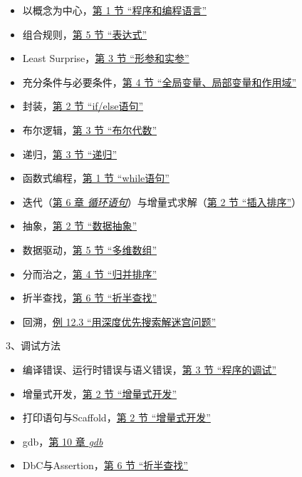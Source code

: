 \begin{itemize}

\item 以概念为中心，\hyperlink{db.intro.program}{第 1 节 “程序和编程语言”}

\item 组合规则，\hyperlink{db.expr.expression}{第 5 节 “表达式”}

\item Least Surprise，\hyperlink{db.ch03s03.id2713785}{第 3 节 “形参和实参”}

\item 充分条件与必要条件，\hyperlink{db.ch03s04.id2714471}{第 4 节 “全局变量、局部变量和作用域”}

\item 封装，\hyperlink{db.ch04s02.id2718511}{第 2 节 “if/\BookSplit{}else语句”}

\item 布尔逻辑，\hyperlink{db.ch04s03.id2718970}{第 3 节 “布尔代数”}

\item 递归，\hyperlink{db.ch05s03.id2722951}{第 3 节 “递归”}

\item 函数式编程，\hyperlink{db.ch06s01.id2726104}{第 1 节 “while语句”}

\item 迭代（\hyperlink{db.ch06.id2726092}{第 6 章 \emph{循环语句}}）与增量式求解（\hyperlink{db.ch11s02.id2745253}{第 2 节 “插入排序”}）

\item 抽象，\hyperlink{db.ch07s02.id2730921}{第 2 节 “数据抽象”}

\item 数据驱动，\hyperlink{db.ch08s05.id2734861}{第 5 节 “多维数组”}

\item 分而治之，\hyperlink{db.ch11s04.id2746095}{第 4 节 “归并排序”}

\item 折半查找，\hyperlink{db.ch11s06.id2746698}{第 6 节 “折半查找”}

\item 回溯，\hyperlink{db.ch12s03.id2750166}{例 12.\BookSplit{}3 “用深度优先搜索解迷宫问题”}
\end{itemize}


3、调试方法


\begin{itemize}

\item 编译错误、运行时错误与语义错误，\hyperlink{db.ch01s03.id2704937}{第 3 节 “程序的调试”}

\item 增量式开发，\hyperlink{db.ch05s02.id2721551}{第 2 节 “增量式开发”}

\item 打印语句与Scaffold，\hyperlink{db.ch05s02.id2721551}{第 2 节 “增量式开发”}

\item gdb，\hyperlink{db.ch10.id2740153}{第 10 章 \emph{gdb}}

\item DbC与Assertion，\hyperlink{db.ch11s06.id2746698}{第 6 节 “折半查找”}
\end{itemize}


